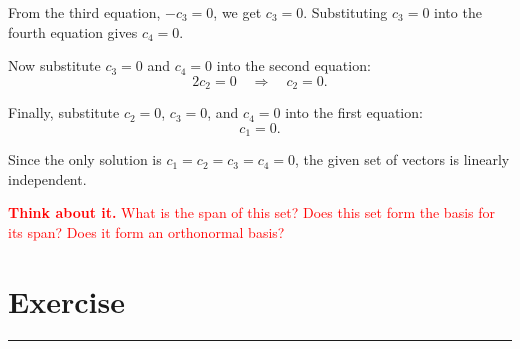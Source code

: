\begin{enumerate}
\begin{boxedstuff}
        From the third equation, $-c_3 = 0$, we get $c_3 = 0$. Substituting $c_3 = 0$ into the fourth equation gives $c_4 = 0$.

        Now substitute $c_3 = 0$ and $c_4 = 0$ into the second equation:
        \[
        2c_2 = 0 \quad \Rightarrow \quad c_2 = 0.
        \]

        Finally, substitute $c_2 = 0$, $c_3 = 0$, and $c_4 = 0$ into the first equation:
        \[
        c_1 = 0.
        \]

        Since the only solution is $c_1 = c_2 = c_3 = c_4 = 0$, the given set of vectors is linearly independent.

        \textcolor{red}{\textbf{Think about it.} What is the span of this set? Does this set form the basis for its span? Does it form an orthonormal basis?}
    \end{boxedstuff}
    
\end{enumerate}
\newpage

\section{Exercise}
\vspace{-0.5cm}
\begin{center}
    \rule{\textwidth}{1pt}
\end{center}

